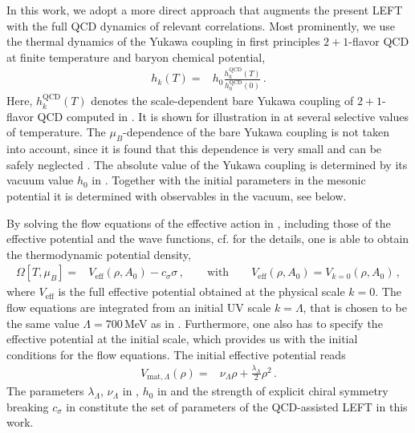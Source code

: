 \documentclass[reprint,twocolumn,superscriptaddress,preprintnumbers,amsmath,amssymb,aps,prd,floatfix]{revtex4-2}
\begin{document}
In this work, we adopt a more direct approach that augments the present LEFT with the full QCD dynamics of relevant correlations. Most prominently, we use the thermal dynamics of the Yukawa coupling in  first principles $2+1$-flavor QCD at finite temperature and baryon chemical potential, 
%
\begin{align}
    h_k(T)=&h_0 \frac{h^{{\scriptscriptstyle \mathrm{QCD}}}_{k}(T)}{h^{\scriptscriptstyle \mathrm{QCD}}_{0}(0)}\,. 
    \label{eq:hQCD}
\end{align}
%
Here, $h^{{\scriptscriptstyle \mathrm{QCD}}}_{k}(T)$ denotes the scale-dependent bare Yukawa coupling of $2+1$-flavor QCD computed in \cite{Fu:2019hdw}. It is shown for illustration in  at several selective values of temperature. The $\mu_B$-dependence of the bare Yukawa coupling is not taken into account, since it is found that this dependence is very small and can be safely neglected \cite{Fu:2019hdw}. The absolute value of the Yukawa coupling is determined by its vacuum value $h_0$ in . Together with the initial parameters in the mesonic potential it is determined with observables in the vacuum, see below. 

By solving the flow equations of the effective action in , including those of the effective potential and the wave functions, cf. \cite{Fu:2021oaw} for the details, one is able to obtain the thermodynamic potential density, 
%
\begin{align}
    \Omega[T,\mu_B]=&V_{\textrm{eff}}(\rho,A_0)-c_\sigma\sigma \,, \qquad \textrm{with}\qquad V_{\textrm{eff}}(\rho,A_0) = V_{k=0}(\rho,A_0)\,, 
\end{align}
%
where $V_{\textrm{eff}}$ is the full  effective potential obtained at the physical scale $k=0$. The flow equations are integrated from an initial UV scale $k=\Lambda$, that is chosen to be the same value $\Lambda=700$\,MeV as in \cite{Fu:2021oaw}. Furthermore, one also has to specify the effective potential at the initial scale, which provides us with the initial conditions for the flow equations. The initial effective potential reads
%
\begin{align}
    V_{\mathrm{mat},  \Lambda}(\rho)=&\nu_{\Lambda}\rho+\frac{\lambda_{\Lambda}}{2}\rho^2  \,.
    \label{eq:VmatLam}
\end{align}
%
The parameters $\lambda_{\Lambda}$, $\nu_{\Lambda}$ in , $h_0$ in  and the strength of explicit chiral symmetry breaking $c_\sigma$ in  constitute the set of parameters of the QCD-assisted LEFT in this work. 
\end{document}
